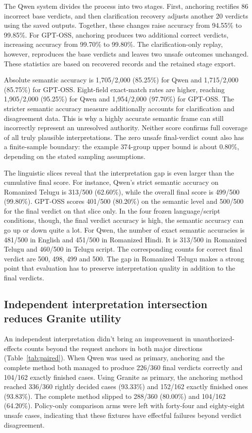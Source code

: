 \documentclass[pdflatex,sn-nature]{sn-jnl}
\begin{document}
The Qwen system divides the process into two stages. First, anchoring rectifies 86 incorrect base verdicts, and then clarification recovery adjusts another 20 verdicts using the saved outputs. Together, these changes raise accuracy from 94.55\% to 99.85\%. For GPT-OSS, anchoring produces two additional correct verdicts, increasing accuracy from 99.70\% to 99.80\%. The clarification-only replay, however, reproduces the base verdicts and leaves two unsafe outcomes unchanged. These statistics are based on recovered records and the retained stage export.

Absolute semantic accuracy is 1,705/2,000 (85.25\%) for Qwen and 1,715/2,000 (85.75\%) for GPT-OSS. Eight-field exact-match rates are higher, reaching 1,905/2,000 (95.25\%) for Qwen and 1,954/2,000 (97.70\%) for GPT-OSS. The stricter semantic accuracy measure additionally accounts for clarification and disagreement data. This is why a highly accurate semantic frame can still incorrectly represent an unresolved authority. Neither score confirms full coverage of all truly plausible interpretations. The zero unsafe final-verdict count also has a finite-sample boundary: the example 374-group upper bound is about 0.80\%, depending on the stated sampling assumptions.

The linguistic slices reveal that the interpretation gap is even larger than the cumulative final score. For instance, Qwen's strict semantic accuracy on Romanized Telugu is 313/500 (62.60\%), while the overall final score is 499/500 (99.80\%). GPT-OSS scores 401/500 (80.20\%) on the semantic level and 500/500 for the final verdict on that slice only. In the four frozen language/script conditions, though, the final verdict accuracy is high, the semantic accuracy can go up or down quite a lot. For Qwen, the number of exact semantic accuracies is 481/500 in English and 451/500 in Romanized Hindi. It is 313/500 in Romanized Telugu and 460/500 in Telugu script. The corresponding counts for correct final verdict are 500, 498, 499 and 500. The gap in Romanized Telugu makes a strong point that evaluation has to preserve interpretation quality in addition to the final verdicts.

\subsection{Independent interpretation intersection reduces Granite utility}

An independent interpretation didn't bring an improvement in unauthorized-effects counts beyond the request anchors in both major directions (Table~\ref{tab:paired}). When Qwen was used as primary, anchoring and the complete method both managed to produce 226/360 final verdicts correctly and 104/162 exactly finished cases. Using Granite as primary, the anchoring method reached 336/360 rightly decided cases (93.33\%) and 152/162 exactly finished ones (93.83\%). The complete method slipped to 288/360 (80.00\%) and 104/162 (64.20\%). Policy-only comparison arms were left with forty-four and eighty-eight unsafe cases, indicating that these fixtures have effectful failures beyond verdict disagreement.
\end{document}
